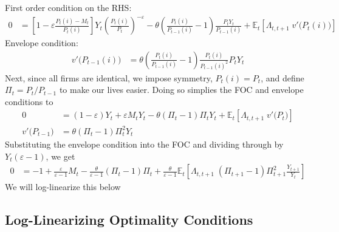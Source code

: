 \documentclass[12pt]{article}
\theoremstyle{plain}
\theoremstyle{definition}
\theoremstyle{remark}
\newcommand{\E}{\mathbb{E}}
\begin{document}
\begin{enumerate}[label=(\roman*)]
\begin{itemize}
        First order condition on the RHS:
        \begin{align*}
          0 &=
          \left[
          1-\varepsilon
          \frac{P_t(i)-M_t}{P_t(i)}
          \right]
          Y_t\left(
          \frac{P_t(i)}{P_t}
          \right)^{-\varepsilon}
          - \theta
          \left(
          \frac{P_{t}(i)}{P_{t-1}(i)}-1
          \right)
          \frac{P_tY_t}{P_{t-1}(i)}
          + \E_t\left[\Lambda_{t,t+1}\;v'\big(P_t(i)\big)\right]
        \end{align*}
        Envelope condition:
        \begin{align*}
          v'\big(P_{t-1}(i)\big)
          &=
          \theta
          \left(
          \frac{P_{t}(i)}{P_{t-1}(i)}-1
          \right)
          \frac{P_{t}(i)}{P_{t-1}(i)^{2}}
          P_tY_t
        \end{align*}
        Next, since all firms are identical, we impose symmetry,
        $P_t(i)=P_t$, and define $\Pi_t=P_t/P_{t-1}$ to make our lives
        easier. Doing so simplies the FOC and envelope conditions to
        \begin{align*}
          0 &=
          (1-\varepsilon)Y_t + \varepsilon M_tY_t
          - \theta
          \left(
          \Pi_t-1
          \right)
          \Pi_tY_t
          + \E_t\left[\Lambda_{t,t+1}\;v'\big(P_t\big)\right]
          \\
          v'\big(P_{t-1}\big)
          &=
          \theta
          \left(
          \Pi_t-1
          \right)
          \Pi_t^2Y_t
        \end{align*}
        Substituting the envelope condition into the FOC and dividing
        through by $Y_t(\varepsilon-1)$, we get
        \begin{align*}
          0 &=
          -1 + \frac{\varepsilon}{\varepsilon-1} M_t
          - \frac{\theta}{\varepsilon-1}
          \left(
          \Pi_t-1
          \right)
          \Pi_t
          + \frac{\theta}{\varepsilon-1}
          \E_t\left[
            \Lambda_{t,t+1}\;
            (\Pi_{t+1}-1)\Pi^2_{t+1}\frac{Y_{t+1}}{Y_t}
          \right]
        \end{align*}
        We will log-linearize this below

  \end{itemize}
\end{enumerate}






\clearpage
\subsection{Log-Linearizing Optimality Conditions}
\end{document}
